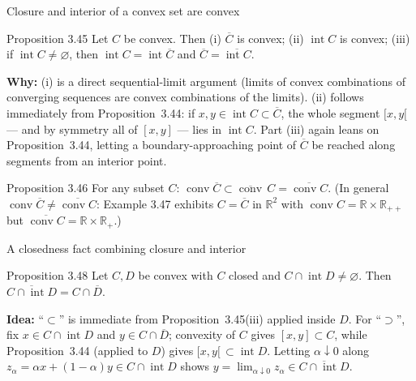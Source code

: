 \documentclass[aspectratio=169,10pt]{beamer}
\newcommand{\R}{\mathbb{R}}
\newcommand{\Rpp}{\mathbb{R}_{++}}
\newcommand{\Rp}{\mathbb{R}_{+}}
\newcommand{\conv}{\operatorname{conv}}
\begin{document}
\begin{frame}{Closure and interior of a convex set are convex}
  \begin{block}{Proposition 3.45}
    Let $C$ be convex. Then (i) $\overline C$ is convex; (ii)
    $\operatorname{int}C$ is convex; (iii) if
    $\operatorname{int}C\ne\varnothing$, then
    $\operatorname{int}C=\operatorname{int}\overline C$ and
    $\overline C = \overline{\operatorname{int}C}$.
  \end{block}
  \textbf{Why:} (i) is a direct sequential-limit argument (limits of convex
  combinations of converging sequences are convex combinations of the
  limits). (ii) follows immediately from Proposition~3.44: if
  $x,y\in\operatorname{int}C\subset\overline C$, the whole segment $[x,y[$
  --- and by symmetry all of $[x,y]$ --- lies in $\operatorname{int}C$. Part
  (iii) again leans on Proposition~3.44, letting a boundary-approaching
  point of $\overline C$ be reached along segments from an interior point.

  \begin{block}{Proposition 3.46}
    For any subset $C$: $\conv\overline C \subset \overline{\conv}\,C =
    \overline{\conv C}$. (In general $\conv\overline C \ne
    \overline{\conv C}$: Example 3.47 exhibits $C=\overline C$ in $\R^2$
    with $\conv C = \R\times\Rpp$ but $\overline{\conv C}=\R\times\Rp$.)
  \end{block}
\end{frame}

\begin{frame}{A closedness fact combining closure and interior}
  \begin{block}{Proposition 3.48}
    Let $C,D$ be convex with $C$ closed and $C\cap\operatorname{int}D\ne
    \varnothing$. Then $\overline{C\cap\operatorname{int}D} = C\cap\overline D$.
  \end{block}
  \textbf{Idea:} ``$\subset$'' is immediate from
  Proposition~3.45(iii) applied inside $D$. For ``$\supset$'', fix
  $x\in C\cap\operatorname{int}D$ and $y\in C\cap\overline D$; convexity of
  $C$ gives $[x,y]\subset C$, while Proposition~3.44 (applied to $D$) gives
  $[x,y[\,\subset\operatorname{int}D$. Letting $\alpha\downarrow 0$ along
  $z_\alpha=\alpha x+(1-\alpha)y \in C\cap\operatorname{int}D$ shows
  $y=\lim_{\alpha\downarrow 0} z_\alpha \in \overline{C\cap
  \operatorname{int}D}$.
\end{frame}
\end{document}
